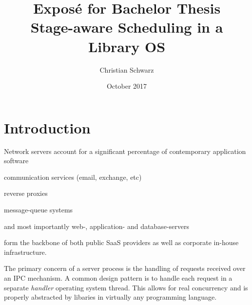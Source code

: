 \documentclass{article}
\title{{\large Exposé for Bachelor Thesis}\\Stage-aware Scheduling in a Library OS}
\author{Christian Schwarz}
\date{October 2017}
\begin{document}
\maketitle

\section{Introduction}






Network servers account for a significant percentage of contemporary application software%
\begin{itemize*}[label={}, before={{:}}, itemjoin={{,}}]
    \item communication services (email, exchange, etc)
    \item reverse proxies
    \item message-queue systems
    \item and most importantly web-, application- and database-servers
\end{itemize*}
form the backbone of both public SaaS providers as well as corporate in-house infrastructure. 

The primary concern of a server process is the handling of requests received over an IPC mechanism.
A common design pattern is to handle each request in a separate \textit{handler} operating system thread.
This allows for real concurrency and is properly abstracted by libaries in virtually any programming language.
\end{document}
